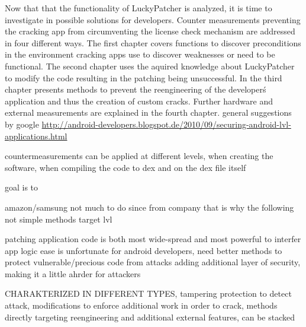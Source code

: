 Now that that the functionality of LuckyPatcher is analyzed, it is time to investigate in possible solutions for developers. Counter measurements preventing the cracking app from circumventing the license check mechanism are addressed in four different ways.\newline
The first chapter covers functions to discover preconditions in the environment cracking apps use to discover weaknesses or need to be functional. The second chapter uses the aquired knowledge about LuckyPatcher to modify the code resulting in the patching being unsuccessful. In the third chapter presents methods to prevent the reengineering of the developer\'s application and thus the creation of custom cracks. Further hardware and external measurements are explained in the fourth chapter.\newline
general suggestions by google  \url{http://android-developers.blogspot.de/2010/09/securing-android-lvl-applications.html}

countermeasurements can be applied at different levels, when creating the software, when compiling the code to dex and on the dex file itself

%
goal is to

amazon/samsung not much to do since from company that is why the following not simple methods target lvl

patching application code is both most wide-spread and most powerful to interfer app logic
ease is unfortunate for android developers, need better methods to protect vulnerable/precious code from attacks
adding additional layer of security, making it a little ahrder for attackers

CHARAKTERIZED IN DIFFERENT TYPES, tampering protection to detect attack, modifications to enforce additional work in order to crack, methods directly targeting reengineering and additional external features, can be stacked
\cite{munteanLicense}
%
